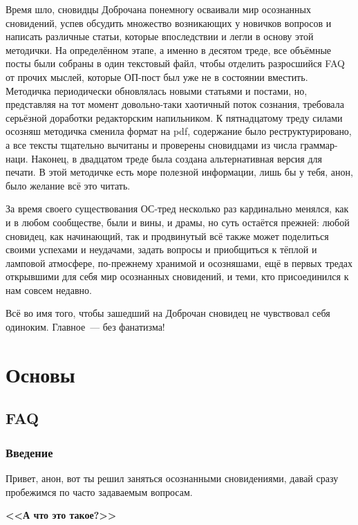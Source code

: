\documentclass[a5paper,12pt,twoside]{memoir}
\begin{document}
Время шло, сновидцы Доброчана понемногу осваивали мир осознанных сновидений, успев обсудить множество возникающих у новичков вопросов и написать различные статьи, которые впоследствии и легли в основу этой методички. На определённом этапе, а именно в десятом треде,  все объёмные посты были собраны в один текстовый файл, чтобы отделить разросшийся FAQ от прочих мыслей, которые ОП-пост был уже не в состоянии вместить. Методичка периодически обновлялась новыми статьями и постами, но, представляя на тот момент довольно-таки хаотичный поток сознания, требовала серьёзной доработки редакторским напильником. К пятнадцатому треду силами осозняш методичка сменила формат на pdf, содержание было реструктурировано, а все тексты тщательно вычитаны и проверены сновидцами из числа граммар-наци. Наконец, в двадцатом треде была создана альтернативная версия для печати. В этой методичке есть море полезной информации, лишь бы у тебя, анон, было желание всё это читать.

\thispagestyle{empty}

За время своего существования ОС-тред несколько раз кардинально менялся, как и в любом сообществе,  были и вины, и драмы, но суть остаётся прежней: любой сновидец, как начинающий, так и продвинутый всё также может поделиться своими успехами и неудачами, задать вопросы и приобщиться к тёплой и ламповой атмосфере, по-прежнему хранимой и осозняшами, ещё в первых тредах открывшими для себя мир осознанных сновидений, и теми, кто присоединился к нам совсем недавно. 

Всё во имя того, чтобы зашедший на Доброчан сновидец не чувствовал себя одиноким. Главное~--- без фанатизма!



\clearpage
\tableofcontents


\part{Основы}

\chapter{FAQ}
\section{Введение}
Привет, анон, вот ты решил заняться осознанными сновидениями, давай сразу пробежимся по часто задаваемым вопросам.

\begin{center}
\textbf{<<А что это такое?>>}
\end{center}
\end{document}

